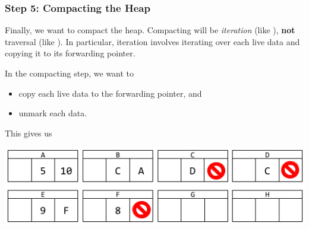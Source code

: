 \documentclass[letterpaper]{article}
\begin{document}

\subsubsection{Step 5: Compacting the Heap}
\begin{mdframed}
    Finally, we want to compact the heap. Compacting will be \emph{iteration} (like ), \textbf{not} traversal (like ). In particular, iteration involves iterating over each live data and copying it to its forwarding pointer.
\end{mdframed}

In the compacting step, we want to 
\begin{itemize}
    \item copy each live data to the forwarding pointer, and 
    \item unmark each data.
\end{itemize}
This gives us 
\begin{center}
    \includegraphics[scale=0.6]{../assets/GCAlg5.png}
\end{center}
\end{document}
